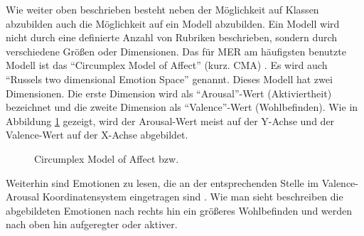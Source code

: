 \documentclass[11pt,a4paper]{article}
\begin{document}
Wie weiter oben beschrieben besteht neben der Möglichkeit auf Klassen abzubilden auch die Möglichkeit auf ein Modell abzubilden. Ein Modell wird nicht durch eine definierte Anzahl von Rubriken beschrieben, sondern durch verschiedene Größen oder Dimensionen. Das für MER am häufigsten benutzte Modell ist das ``Circumplex Model of Affect'' (kurz. CMA) \cite[S. 158 f.]{lerch2012introduction}. Es wird auch ``Russels two dimensional Emotion Space'' genannt. Dieses Modell hat zwei Dimensionen. Die erste Dimension wird als ``Arousal''-Wert (Aktiviertheit) bezeichnet und die zweite Dimension als ``Valence''-Wert (Wohlbefinden). Wie in Abbildung \ref{fig:CMA} gezeigt, wird der Arousal-Wert meist auf der Y-Achse und der Valence-Wert auf der X-Achse abgebildet.
\begin{center}
\begin{figure}[!ht]
\centering
{}
\caption[Circumplex Model of Affect]{Circumplex Model of Affect \cite[S. 4]{8a02f9c512933d46fbea928d23ac65e38b61b88caba9b38319a5d4952b5a6667} bzw. \cite[S. 7]{russell1980circumplex}}
\label{fig:CMA}
\end{figure}
\end{center}
\noindent
Weiterhin sind Emotionen zu lesen, die an der entsprechenden Stelle im Valence-Arousal Koordinatensystem eingetragen sind \cite[S. 4]{8a02f9c512933d46fbea928d23ac65e38b61b88caba9b38319a5d4952b5a6667} \cite[S. 7]{russell1980circumplex}. Wie man sieht beschreiben die abgebildeten Emotionen nach rechts hin ein größeres Wohlbefinden und werden nach oben hin aufgeregter oder aktiver.\\
\end{document}
